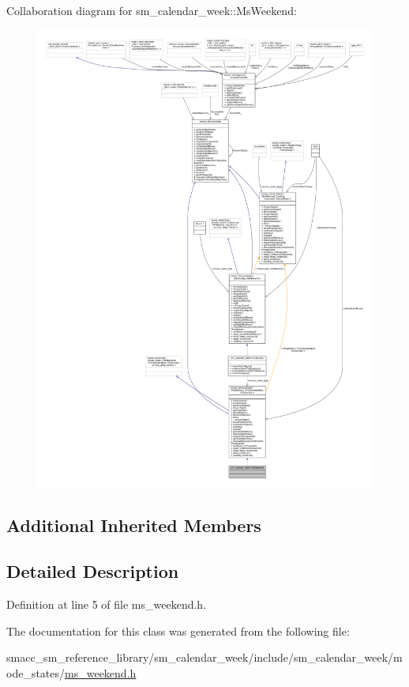 Collaboration diagram for sm\+\_\+calendar\+\_\+week\+:\+:Ms\+Weekend\+:
\nopagebreak
\begin{figure}[H]
\begin{center}
\leavevmode
\includegraphics[width=350pt]{classsm__calendar__week_1_1MsWeekend__coll__graph}
\end{center}
\end{figure}
\subsection*{Additional Inherited Members}


\subsection{Detailed Description}


Definition at line 5 of file ms\+\_\+weekend.\+h.



The documentation for this class was generated from the following file\+:\begin{DoxyCompactItemize}
\item 
smacc\+\_\+sm\+\_\+reference\+\_\+library/sm\+\_\+calendar\+\_\+week/include/sm\+\_\+calendar\+\_\+week/mode\+\_\+states/\hyperlink{ms__weekend_8h}{ms\+\_\+weekend.\+h}\end{DoxyCompactItemize}
